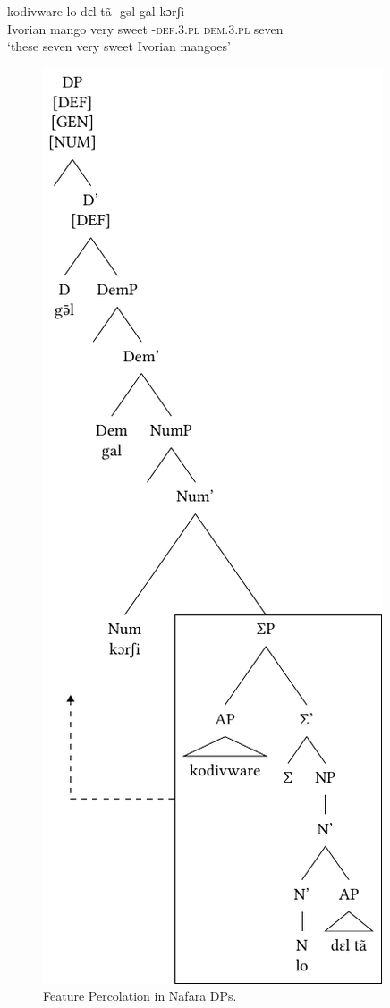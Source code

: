 \documentclass[output=paper]{langscibook}
\begin{document}
\ea\label{ex:baron:16}
kodivware lo dɛl tã -gəl gal kɔrʃi\\
   Ivorian mango very  sweet  -\textsc{def.3.pl} \textsc{dem.3.pl} seven  \\
\glt ‘these seven very sweet Ivorian mangoes’
\z

\begin{figure}
\includegraphics{figures/baron-img3.pdf}
\caption{Feature Percolation in Nafara DPs.}
\label{fig:baron:3}
\end{figure}
\end{document}
